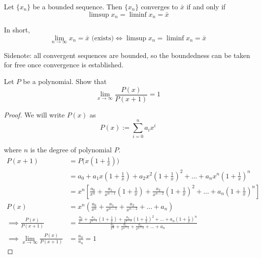 \label{dbc2c89}

Let $\{x_n\}$ be a bounded sequence. Then $\{x_n\}$ converges to $\bar x$ if
and only if
$$
  \limsup x_n=\liminf x_n=\bar x
$$

In short,
$$
  \lim_{n\to\infty}x_n=\bar x\text{ (exists)}\iff\limsup x_n=\liminf x_n=\bar x
$$

Sidenote: all convergent sequences are bounded, so the boundedness can be taken
for free once convergence is established.

\label{b63d815}

Let $P$ be a polynomial. Show that
$$
  \lim_{x\to\infty}\frac{P(x)}{P(x+1)}=1
$$

\begin{proof}
  \def\one{\left(1+\frac1x\right)}
  We will write $P(x)$ as
  $$
    P(x):=\sum_{i=0}^n a_ix^i
  $$

  where $n$ is the degree of polynomial $P$.
  \begin{align*}
    P(x+1)
     & =P\big(x(1+\tfrac1x)\big)                                                                           \\
     & =a_0+a_1x\one+a_2x^2\one^2+\ldots+a_nx^n\one^n                                                      \\
     & =x^n\left[\frac{a_0}{x^n}+\frac{a_1}{x^{n-1}}\one+\frac{a_2}{x^{n-2}}\one^2+\ldots+a_n\one^n\right] \\[0.5em]
    P(x)
     & =x^n\left(\frac{a_0}{x^n}+\frac{a_1}{x^{n-1}}+\frac{a_2}{x^{n-2}}+\ldots+a_n\right)                 \\[0.5em]
    \implies \frac{P(x)}{P(x+1)}
     & =\frac
    {\frac{a_0}{x^n}+\frac{a_1}{x^{n-1}}\one+\frac{a_2}{x^{n-2}}\one^2+\ldots+a_n\one^n}
    {\frac{a_0}{x^n}+\frac{a_1}{x^{n-1}}+\frac{a_2}{x^{n-2}}+\ldots+a_n}                                   \\[0.5em]
    \implies \lim_{x\to\infty}\frac{P(x)}{P(x+1)}
     & =\frac{a_n}{a_n} = 1
  \end{align*}
\end{proof}


\label{b869dc0}

